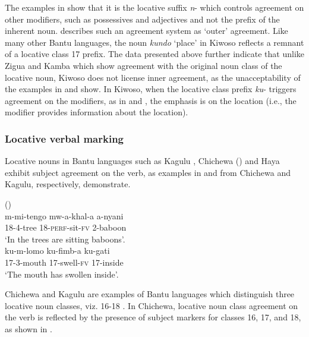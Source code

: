 \documentclass[output=paper]{langscibook}
\begin{document}
    \z
\z

The examples in  show that it is the locative suffix \textit{n}{}- which controls agreement on other modifiers, such as possessives and adjectives and not the prefix of the inherent noun. \citet{Marten2012} describes such an agreement system as ‘outer’ agreement. Like many other Bantu languages, the noun \textit{kundo} ‘place’ in Kiwoso reflects a remnant of a locative class 17 prefix. The data presented above further indicate that unlike Zigua and Kamba \citep{Marten2012} which show agreement with the original noun class of the locative noun, Kiwoso does not license inner agreement, as the unacceptability of the examples in  and  show. In Kiwoso, when the locative class prefix \textit{ku}{}- triggers agreement on the modifiers, as in  and , the emphasis is on the location (i.e., the modifier provides information about the location). 

\subsubsection{Locative verbal marking}
\label{sec:mallya:4.3.2}

Locative nouns in Bantu languages such as Kagulu \citep{Petzell2008}, Chichewa (\citealt{BresnanKanerva1989}) and Haya \citep{Riedel2010} exhibit subject agreement on the verb, as examples in  and  from Chichewa and Kagulu, respectively, demonstrate.

\ea%
    \label{ex:mallya:11}(\citealt[3]{BresnanKanerva1989})\\
    \gll m-mi-tengo    mw-a-khal-a    a-nyani\\
  18-4-tree      18-\textsc{perf}-sit-\textsc{fv}    2-baboon\\
  \glt ‘In the trees are sitting baboons’.
\ex%
    \label{ex:mallya:12}\citep[75]{Petzell2008}\\
    \gll ku-m-lomo    ku-fimb-a      ku-gati\\               
  17-3-mouth  17-swell-\textsc{fv}  17-inside\\ 
  \glt ‘The mouth has swollen inside’.
\z

Chichewa and Kagulu are examples of Bantu languages which distinguish three locative noun classes, viz. 16-18 \citep{MartenEtAl2007}. In Chichewa, locative noun class agreement on the verb is reflected by the presence of subject markers for classes 16, 17, and 18, as shown in .
\end{document}
